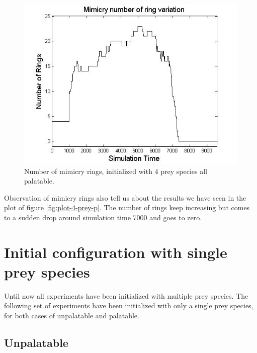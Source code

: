 \begin{figure}[H]
	\centering
	\includegraphics[scale=0.50]{images/ringSize10k-4Prey-p}
	\caption[Number of mimicry rings (4 prey species all palatable)]{Number of mimicry rings, initialized with 4 prey species all palatable.}
	\label{fig:ringSize8k-4-Prey-p}
\end{figure}

Observation of mimicry rings also tell us about the results we have seen in the plot of figure \ref{fig:plot-4-prey-p}. The number of rings keep increasing but comes to a sudden drop around simulation time 7000 and goes to zero.

\section{Initial configuration with single prey species}
Until now all experiments have been initialized with multiple prey species. The following set of experiments have been initialized with only a single prey species, for both cases of unpalatable and palatable.

\subsection{Unpalatable}
\label{subsec:single-prey-unpalatable}


